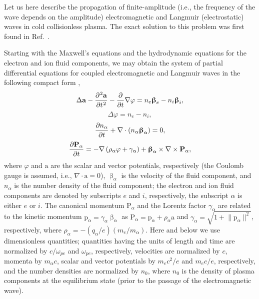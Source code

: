 \documentclass[10pt, a4paper, twoside, openright]{report}
\newcommand{\norm}[1]{\lVert#1\rVert}
\renewcommand{\vec}[1]{\boldsymbol{\mathrm{#1}}}
\newcommand{\rot}[1]{\nabla \times #1}
\newcommand{\grad}[1]{\nabla #1}
\renewcommand{\div}[1]{\nabla \cdot #1}
\newcommand{\laplace}[1]{\Delta #1}
\begin{document}
Let us here describe the propagation of finite-amplitude (i.e., the frequency of the wave depends on the amplitude) electromagnetic and Langmuir (electrostatic) waves in cold collisionless plasma. The exact solution to this problem was first found in Ref.~.

Starting with the Maxwell's equations and the hydrodynamic equations for the electron and ion fluid components, we may obtain the system of partial differential equations for coupled electromagnetic and Langmuir waves in the following compact form \cite{Farina2001, Bulanov2013, Bulanov2021},
\begin{equation}\label{eq:eq_for_vector_potential}
\laplace{\vec{a}} - \diffp[2]{\vec{a}}{t} - \diffp{}{t} \grad{\varphi} = n_e \vec{\upbeta}_e - n_i \vec{\upbeta}_i,
\end{equation}
\begin{equation}\label{eq:eq_for_scalar_potential}
\laplace{\varphi} = n_e - n_i,
\end{equation}
\begin{equation}\label{eq:eq_for_density}
\diffp{n_{\alpha}}{t} +  \div{ \left( n_{\alpha} \vec{\upbeta}_{\alpha} \right) } = 0,
\end{equation}
\begin{equation}\label{eq:eq_for_momentum}
\diffp{\vec{P}_{\alpha}}{t} = - \grad{\left( \rho_{\alpha} \varphi + \gamma_{\alpha} \right)} + \vec{\upbeta}_{\alpha} \times \rot{\vec{P}_{\alpha}},
\end{equation}
where $ \varphi $ and $ \vec{a} $ are the scalar and vector potentials, respectively (the Coulomb gauge is assumed, i.e., $ \div{\vec{a}} = 0 $), $ \vec{\upbeta}_{\alpha} $ is the velocity of the fluid component, and $ n_{\alpha} $ is the number density of the fluid component; the electron and ion fluid components are denoted by subscripts $ e $ and $ i $, respectively, the subscript $ \alpha $ is either $ e $ or $ i $. The canonical momentum $ \vec{P}_{\alpha} $ and the Lorentz factor $ \gamma_{\alpha} $ are related to the kinetic momentum $ \vec{p}_{\alpha} = \gamma_{\alpha} \vec{\upbeta}_{\alpha} $ as $ \vec{P}_{\alpha} = \vec{p}_{\alpha} + \rho_{\alpha} \vec{a} $ and $ \gamma_{\alpha} = \sqrt{1 + \norm{\vec{p}_{\alpha}}^2} $, respectively, where $ \rho_{\alpha} = - \left( q_{\alpha} / e \right) \left( m_e / m_{\alpha} \right) $. Here and below we use dimensionless quantities; quantities having the units of length and time are normalized by $ c / \omega_{pe} $ and $ \omega_{pe} $, respectively, velocities are normalized by $ c $, momenta by $ m_{\alpha} c $, scalar and vector potentials by $ m_e c^2 / e $ and $ m_e c / e $, respectively, and the number densities are normalized by $ n_0 $, where $ n_0 $ is the density of plasma components at the equilibrium state (prior to the passage of the electromagnetic wave).
\end{document}
